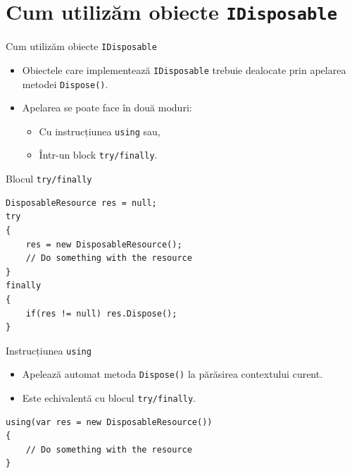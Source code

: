 \documentclass[presentation]{beamer}
\begin{document}
\section{Cum utilizăm obiecte \texttt{IDisposable}}
\label{sec:org5e8cddd}
\begin{frame}[label={sec:org606ec02},fragile]{Cum utilizăm obiecte \texttt{IDisposable}}
 \begin{itemize}
\item Obiectele care implementează \texttt{IDisposable} trebuie dealocate prin apelarea metodei \texttt{Dispose()}.
\item Apelarea se poate face în două moduri:
\begin{itemize}
\item Cu instrucțiunea \texttt{using} sau,
\item Într-un block \texttt{try/finally}.
\end{itemize}
\end{itemize}
\end{frame}
\begin{frame}[label={sec:orgac5639f},fragile]{Blocul \texttt{try/finally}}
 \begin{verbatim}
DisposableResource res = null;
try
{
    res = new DisposableResource();
    // Do something with the resource
}
finally
{
    if(res != null) res.Dispose();
}
\end{verbatim}
\end{frame}
\begin{frame}[label={sec:org4713340},fragile]{Instrucțiunea \texttt{using}}
 \begin{itemize}
\item Apelează automat metoda \texttt{Dispose()} la părăsirea contextului curent.
\item Este echivalentă cu blocul \texttt{try/finally}.
\end{itemize}
\vskip 0.3in
\begin{verbatim}
using(var res = new DisposableResource())
{
    // Do something with the resource
}
\end{verbatim}
\end{frame}
\end{document}
